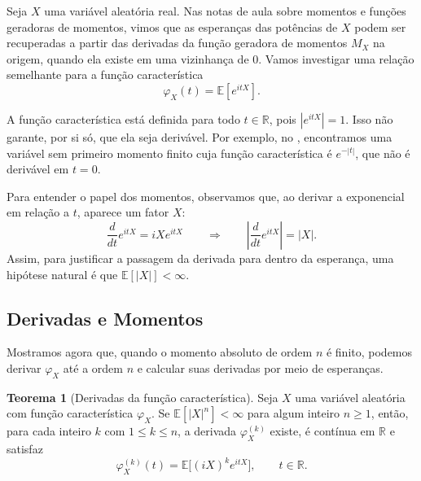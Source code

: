 \documentclass[12pt,portuguese]{article}
\theoremstyle{definition}
\newtheorem{theorem}{Teorema}
\theoremstyle{plainexercise}
\theoremstyle{starredexercise}
\theoremstyle{definition}
\begin{document}
Seja $X$ uma variável aleatória real. Nas notas de aula sobre momentos e funções
geradoras de momentos, vimos que as esperanças das potências de $X$ podem ser
recuperadas a partir das derivadas da função geradora de momentos $M_X$ na origem,
quando ela existe em uma vizinhança de $0$.
Vamos investigar uma relação semelhante para a função característica
\[
\varphi_X(t)=\mathbb{E}[e^{itX}].
\]

A função característica está definida para todo $t\in\mathbb{R}$, pois
$|e^{itX}|=1$. Isso não garante, por si só, que ela seja derivável. Por
exemplo, no , encontramos uma variável sem primeiro momento
finito cuja função característica é $e^{-|t|}$, que não é derivável em
$t=0$.

Para entender o papel dos momentos, observamos que, ao derivar a exponencial
em relação a $t$, aparece um fator $X$:
\[
\frac{d}{dt}e^{itX}=iX e^{itX}
\qquad \Longrightarrow \qquad 
\left|\frac{d}{dt}e^{itX}\right|=|X|.
\]
Assim, para justificar a passagem da derivada para dentro da esperança, uma
hipótese natural é que $\mathbb{E}[|X|]<\infty$.

\subsection{Derivadas e Momentos}\label{subsec:momentos-derivadas}

Mostramos agora que, quando o momento absoluto de ordem $n$ é finito, podemos
derivar $\varphi_X$ até a ordem $n$ e calcular suas derivadas por meio de esperanças.

\begin{theorem}[Derivadas da função característica]
\label{thm:derivadas-momentos}
\label{prop:man-derivadas-fc}
Seja $X$ uma variável aleatória com função característica $\varphi_X$.
Se $\mathbb{E}[|X|^n]<\infty$ para algum inteiro $n\geqslant1$, então, para
cada inteiro $k$ com $1\leqslant k\leqslant n$, a derivada $\varphi_X^{(k)}$
existe, é contínua em $\mathbb{R}$ e satisfaz
\[
\varphi_X^{(k)}(t)
=\mathbb{E}\bigl[(iX)^k e^{itX}\bigr],
\qquad t\in\mathbb{R}.
\]
\end{theorem}
\end{document}
